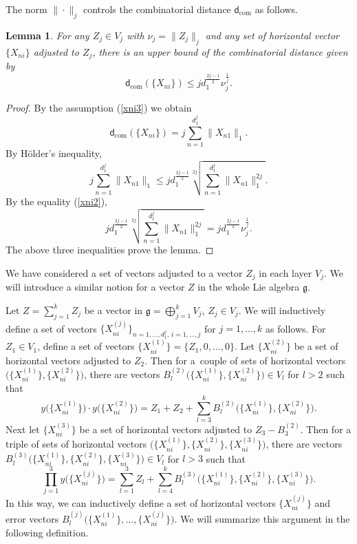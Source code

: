 \documentclass[10pt,a4paper]{amsart}
\numberwithin{equation}{section}
\newtheorem{Lemma}[Theorem]{Lemma}
\newcommand{\g}{\mathfrak{g}}
\begin{document}
The norm $\|\cdot\|_j$ controls the combinatorial distance $\mathsf{d}_{\mathrm{com}}$ as follows.

\begin{Lemma}\label{lemCC}
For any $Z_j\in V_j$ with $\nu_j=\|Z_j\|_j$ and any set of horizontal vector $\{X_{ni}\}$ adjusted to $Z_j$,
there is an upper bound of the combinatorial distance given by
\[
\mathsf{d}_{\mathrm{com}}(\{X_{ni}\})\leq jd_1^{\frac{2j-1}{2}}\nu_j^{\frac{1}{j}}.
\]
\end{Lemma}

\begin{proof}
By the assumption (\ref{xni3})
we obtain
\[
 \mathsf{d}_{\mathrm{com}}(\{X_{ni}\})=j \sum_{n=1}^{d_1^j}\|X_{n1}\|_1.
\]
By H\"older's inequality,
\[j \sum_{n=1}^{d_1^j}\|X_{n1}\|_1\leq jd_1^{\frac{2j-1}{2}}\sqrt[2j]{\sum_{n=1}^{d_1^j}\|X_{n1}\|_1^{2j}}.
\]
By the equality (\ref{xni2}),
\[
 jd_1^{\frac{2j-1}{2}}\sqrt[2j]{\sum_{n=1}^{d_1^j}\|X_{n1}\|_1^{2j}}=jd_1^{\frac{2j-1}{2}}\nu_j^{\frac{1}{j}}.
\]
The above three inequalities prove the lemma.
\end{proof}

We have considered a set of vectors adjusted to a vector $Z_j$ in each layer $V_j$.
We will introduce a similar notion for a vector $Z$ in the whole Lie algebra $\g$.

Let $Z=\sum_{j=1}^k Z_j$ be a vector in $\g=\bigoplus_{j=1}^k V_j$, $Z_j\in V_j$.
We will inductively define a set of vectors $\bigl\{X_{ni}^{(j)}\bigr\}_{n=1,\dots,d_1^j,\,i=1,\dots,j}$ for $j=1,\dots,k$ as follows.
For $Z_1\in V_1$,
define a set of vectors $\bigl\{X_{ni}^{(1)}\bigr\}=\{Z_1,0,\dots,0\}$.
Let $\bigl\{X_{ni}^{(2)}\bigr\}$ be a set of horizontal vectors adjusted to $Z_2$.
Then for a~couple of sets of horizontal vectors $\bigl(\bigl\{X_{ni}^{(1)}\bigr\},\bigl\{X_{ni}^{(2)}\bigr\}\bigr)$,
there are vectors $B_l^{(2)}\bigl(\bigl\{X_{ni}^{(1)}\bigr\},\bigl\{X_{ni}^{{(2)}}\bigr\}\bigr)\allowbreak\in V_l$ for $l>2$ such that
\[
y\bigl(\bigl\{X_{ni}^{(1)}\bigr\}\bigr)\cdot y\bigl(\bigl\{X_{ni}^{(2)}\bigr\}\bigr) =Z_1+Z_2+\sum_{l=3}^kB_l^{(2)}\bigl(\bigl\{X_{ni}^{(1)}\bigr\},\bigl\{X_{ni}^{(2)}\bigr\}\bigr).
\]
Next let $\bigl\{X_{ni}^{(3)}\bigr\}$ be a set of horizontal vectors adjusted to $Z_3-B_3^{(2)}$.
Then for a triple of sets of horizontal vectors $\bigl(\bigl\{X_{ni}^{(1)}\bigr\},\bigl\{X_{ni}^{(2)}\bigr\},\bigl\{X_{ni}^{(3)}\bigr\}\bigr)$,
there are vectors $B_l^{(3)}\bigl(\bigl\{X_{ni}^{(1)}\bigr\},\bigl\{X_{ni}^{(2)}\bigr\},\bigl\{X_{ni}^{(3)}\bigr\}\bigr)\allowbreak\in V_l$ for $l>3$ such that
\[
\prod_{j=1}^3y\big(\bigl\{X_{ni}^{(j)}\bigr\}\big)=\sum_{l=1}^3Z_l+\sum_{l=4}^k B_l^{(3)}\bigl(\bigl\{X_{ni}^{(1)}\bigr\},\bigl\{X_{ni}^{(2)}\bigr\},\bigl\{X_{ni}^{(3)}\bigr\}\bigr).
\]
In this way,
we can inductively define a set of horizontal vectors $\bigl\{X_{ni}^{(j)}\bigr\}$ and error vectors $B_l^{(j)}\bigl(\bigl\{X_{ni}^{(1)}\bigr\},\dots,\bigl\{X_{ni}^{(j)}\bigr\}\bigr)$.
We will summarize this argument in the following definition.
\end{document}
